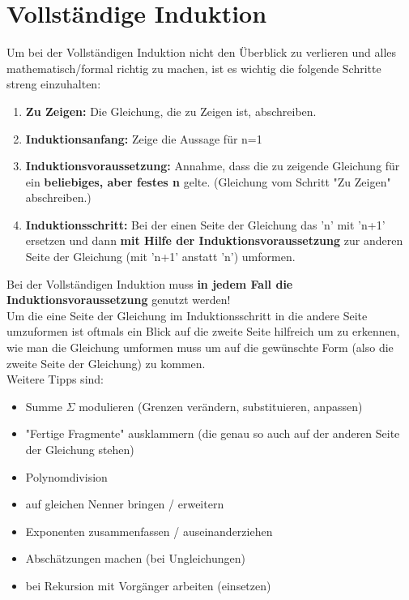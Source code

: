 \documentclass[a4paper,12pt]{article} %
\begin{document}
\section{Vollständige Induktion}
Um bei der Vollständigen Induktion nicht den Überblick zu verlieren und alles mathematisch/formal richtig zu machen, ist es wichtig die folgende Schritte streng einzuhalten:

\begin{enumerate}
\item \textbf{Zu Zeigen:} Die Gleichung, die zu Zeigen ist, abschreiben.
\item \textbf{Induktionsanfang:} Zeige die Aussage für n=1
\item \textbf{Induktionsvoraussetzung:} Annahme, dass die zu zeigende Gleichung für ein \textbf{beliebiges, aber festes n} gelte. (Gleichung vom Schritt "Zu Zeigen" abschreiben.)
\item \textbf{Induktionsschritt:} Bei der einen Seite der Gleichung das 'n' mit 'n+1' ersetzen und dann \textbf{mit Hilfe der Induktionsvoraussetzung} zur anderen Seite der Gleichung (mit 'n+1' anstatt 'n') umformen.
\end{enumerate}
Bei der Vollständigen Induktion muss \textbf{in jedem Fall die Induktionsvoraussetzung} genutzt werden!\\
Um die eine Seite der Gleichung im Induktionsschritt in die andere Seite umzuformen ist oftmals ein Blick auf die zweite Seite hilfreich um zu erkennen, wie man die Gleichung umformen muss um auf die gewünschte Form (also die zweite Seite der Gleichung) zu kommen.\\ 
Weitere Tipps sind:
\begin{itemize}
\item Summe $\Sigma$ modulieren (Grenzen verändern, substituieren, anpassen)
\item "Fertige Fragmente" ausklammern (die genau so auch auf der anderen Seite der Gleichung stehen)
\item Polynomdivision
\item auf gleichen Nenner bringen / erweitern
\item Exponenten zusammenfassen / auseinanderziehen
\item Abschätzungen machen (bei Ungleichungen)
\item bei Rekursion mit Vorgänger arbeiten (einsetzen)
\end{itemize}
\end{document}
